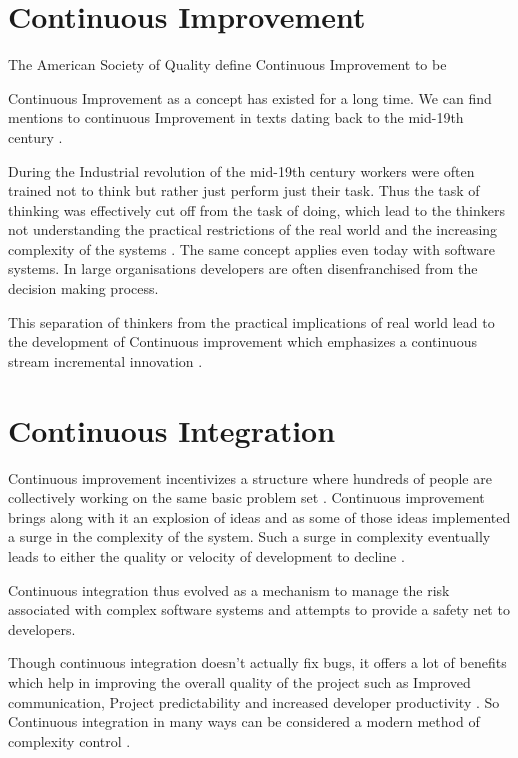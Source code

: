 \section*{Continuous Improvement}

The American Society of Quality define Continuous Improvement to be 
 \cite{american_society_for_quality_continuous_????}

Continuous Improvement as a concept has existed for a long time. We can find mentions to continuous Improvement in texts dating back to the mid-19th century \cite{schroeder_americas_????}. 

During the Industrial revolution of the mid-19th century workers were often trained not to think but rather just perform just their task. Thus the task of thinking was effectively cut off from the task of doing, which lead to the thinkers not understanding the practical restrictions of the real world and the increasing complexity of the systems \cite{schroeder_americas_????}. The same concept applies even today with software systems. In large organisations developers are often disenfranchised from the decision making process.

This separation of thinkers from the practical implications of real world lead to the development of Continuous improvement which emphasizes a continuous stream incremental innovation \cite{bessant_rediscovering_1994}.

\section*{Continuous Integration}

Continuous improvement incentivizes a structure where hundreds of people are collectively working on the same basic problem set \cite{bessant_rediscovering_1994}. Continuous improvement brings along with it an explosion of ideas and as some of those ideas implemented a surge in the complexity of the system. Such a surge in complexity eventually leads to either the quality or velocity of development to decline \cite{zaytsev_increasing_2013} . 

Continuous integration thus evolved as a mechanism to manage the risk associated with complex software systems \cite{zaytsev_increasing_2013} and  attempts to provide a safety net \cite{fowler_continuous_2006} to developers. 

Though continuous integration doesn't actually fix bugs, it offers a lot of benefits which help in improving the overall quality of the project such as Improved communication, Project predictability and increased developer productivity \cite{sta_ahl_experienced_2013}. So Continuous integration in many ways can be considered a modern method of complexity control \cite{beck_extreme_2000}.

